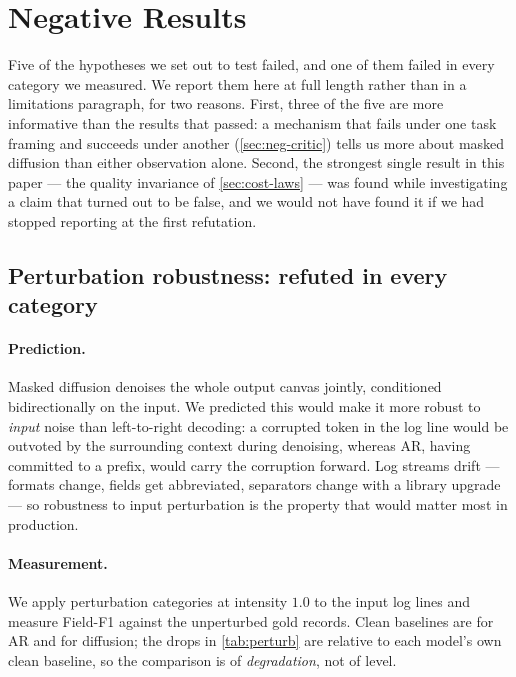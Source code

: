%
\section{Negative Results}
\label{sec:negative}

Five of the hypotheses we set out to test failed, and one of them failed in
every category we measured. We report them here at full length rather than in a
limitations paragraph, for two reasons. First, three of the five are more
informative than the results that passed: a mechanism that fails under one task
framing and succeeds under another (\cref{sec:neg-critic}) tells us more about
masked diffusion than either observation alone. Second, the strongest single
result in this paper --- the quality invariance of \cref{sec:cost-laws} --- was
found while investigating a claim that turned out to be false, and we would not
have found it if we had stopped reporting at the first refutation.

\subsection{Perturbation robustness: refuted in every category}
\label{sec:neg-perturb}

\paragraph{Prediction.} Masked diffusion denoises the whole output canvas
jointly, conditioned bidirectionally on the input. We predicted this would make
it more robust to \emph{input} noise than left-to-right decoding: a corrupted
token in the log line would be outvoted by the surrounding context during
denoising, whereas AR, having committed to a prefix, would carry the corruption
forward. Log streams drift --- formats change, fields get abbreviated,
separators change with a library upgrade --- so robustness to input perturbation
is the property that would matter most in production.

\paragraph{Measurement.} We apply \perturbCategories{} perturbation categories
at intensity $1.0$ to the input log lines and measure Field-F1 against the
unperturbed gold records. Clean baselines are \perturbCleanAR{} for AR and
\perturbCleanDM{} for diffusion; the drops in \cref{tab:perturb} are relative to
each model's own clean baseline, so the comparison is of \emph{degradation},
not of level.

